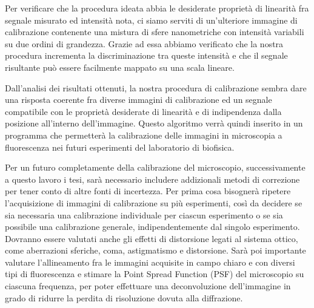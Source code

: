 Per verificare che la procedura ideata abbia le desiderate proprietà di linearità fra segnale misurato ed intensità nota, ci siamo serviti di un'ulteriore immagine di calibrazione contenente una mistura di sfere nanometriche con intensità variabili su due ordini di grandezza.
Grazie ad essa abbiamo verificato che la nostra procedura incrementa la discriminazione tra queste intensità e che il segnale risultante può essere facilmente mappato su una scala lineare. 

Dall'analisi dei risultati ottenuti, la nostra procedura di calibrazione sembra dare una risposta coerente fra diverse immagini di calibrazione ed un segnale compatibile con le proprietà desiderate di linearità e di indipendenza dalla posizione all'interno dell'immagine. 
Questo algoritmo verrà quindi inserito in un programma che permetterà la calibrazione delle immagini in microscopia a fluorescenza nei futuri esperimenti del laboratorio di biofisica.

Per un futuro completamente della calibrazione del microscopio, successivamente a questo lavoro i tesi, sarà necessario includere addizionali metodi di correzione per tener conto di altre fonti di incertezza.
Per prima cosa bisognerà ripetere l'acquisizione di immagini di calibrazione su più esperimenti, così da decidere se sia necessaria una calibrazione individuale per ciascun esperimento o se sia possibile una calibrazione generale, indipendentemente dal singolo esperimento.
Dovranno essere valutati anche gli effetti di distorsione legati al sistema ottico, come aberrazioni sferiche, coma, astigmatismo e distorsione.
Sarà poi importante valutare l'allineamento fra le immagini acquisite in campo chiaro e con diversi tipi di fluorescenza e stimare la Point Spread Function (PSF) del microscopio su ciascuna frequenza, per poter effettuare una deconvoluzione dell'immagine in grado di ridurre la perdita di risoluzione dovuta alla diffrazione.
